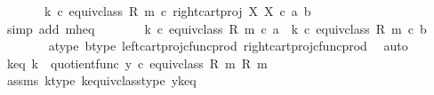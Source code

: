 \begin{isabellebody}
\ \ \ \ \ \ \ {\isacharparenleft}{\kern0pt}k\ {\isasymcirc}\isactrlsub c\ equiv{\isacharunderscore}{\kern0pt}class\ {\isacharparenleft}{\kern0pt}R{\isacharcomma}{\kern0pt}\ m{\isacharparenright}{\kern0pt}{\isacharparenright}{\kern0pt}\ {\isasymcirc}\isactrlsub c\ right{\isacharunderscore}{\kern0pt}cart{\isacharunderscore}{\kern0pt}proj\ X\ X\ {\isasymcirc}\isactrlsub c\ {\isasymlangle}a{\isacharcomma}{\kern0pt}\ b{\isasymrangle}{\isachardoublequoteclose}\isanewline
\ \ \ \ \ \ \isamarkupfalse%
\ {\isacharparenleft}{\kern0pt}simp\ add{\isacharcolon}{\kern0pt}\ m{\isacharunderscore}{\kern0pt}h{\isacharunderscore}{\kern0pt}eq{\isacharparenright}{\kern0pt}\isanewline
\ \ \ \ \isamarkupfalse%
\ \isamarkupfalse%
\ {\isachardoublequoteopen}{\isacharparenleft}{\kern0pt}k\ {\isasymcirc}\isactrlsub c\ equiv{\isacharunderscore}{\kern0pt}class\ {\isacharparenleft}{\kern0pt}R{\isacharcomma}{\kern0pt}\ m{\isacharparenright}{\kern0pt}{\isacharparenright}{\kern0pt}\ {\isasymcirc}\isactrlsub c\ a\ {\isacharequal}{\kern0pt}\ {\isacharparenleft}{\kern0pt}k\ {\isasymcirc}\isactrlsub c\ equiv{\isacharunderscore}{\kern0pt}class\ {\isacharparenleft}{\kern0pt}R{\isacharcomma}{\kern0pt}\ m{\isacharparenright}{\kern0pt}{\isacharparenright}{\kern0pt}\ {\isasymcirc}\isactrlsub c\ b{\isachardoublequoteclose}\isanewline
\ \ \ \ \ \ \isamarkupfalse%
\ a{\isacharunderscore}{\kern0pt}type\ b{\isacharunderscore}{\kern0pt}type\ left{\isacharunderscore}{\kern0pt}cart{\isacharunderscore}{\kern0pt}proj{\isacharunderscore}{\kern0pt}cfunc{\isacharunderscore}{\kern0pt}prod\ right{\isacharunderscore}{\kern0pt}cart{\isacharunderscore}{\kern0pt}proj{\isacharunderscore}{\kern0pt}cfunc{\isacharunderscore}{\kern0pt}prod\ \isamarkupfalse%
\ auto\isanewline
\ \ \isamarkupfalse%
\isanewline
\isanewline
\ \ \isamarkupfalse%
\ k{\isacharunderscore}{\kern0pt}eq{\isacharcolon}{\kern0pt}\ {\isachardoublequoteopen}k\ {\isacharequal}{\kern0pt}\ quotient{\isacharunderscore}{\kern0pt}func\ {\isacharparenleft}{\kern0pt}y\ {\isasymcirc}\isactrlsub c\ equiv{\isacharunderscore}{\kern0pt}class\ {\isacharparenleft}{\kern0pt}R{\isacharcomma}{\kern0pt}\ m{\isacharparenright}{\kern0pt}{\isacharparenright}{\kern0pt}\ {\isacharparenleft}{\kern0pt}R{\isacharcomma}{\kern0pt}\ m{\isacharparenright}{\kern0pt}{\isachardoublequoteclose}\isanewline
\ \ \ \ \isamarkupfalse%
\ assms\ k{\isacharunderscore}{\kern0pt}type\ k{\isacharunderscore}{\kern0pt}equiv{\isacharunderscore}{\kern0pt}class{\isacharunderscore}{\kern0pt}type\ y{\isacharunderscore}{\kern0pt}k{\isacharunderscore}{\kern0pt}eq\isanewline

\end{isabellebody}
